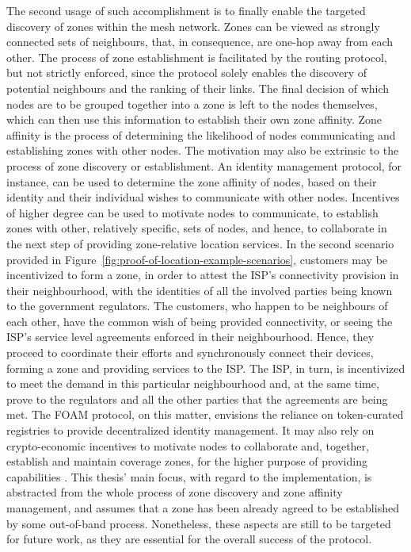 The second usage of such accomplishment is to finally enable the targeted discovery of zones within the mesh network. Zones can be viewed as strongly connected sets of neighbours, that, in consequence, are one-hop away from each other. The process of zone establishment is facilitated by the routing protocol, but not strictly enforced, since the protocol solely enables the discovery of potential neighbours and the ranking of their links. The final decision of which nodes are to be grouped together into a zone is left to the nodes themselves, which can then use this information to establish their own zone affinity. Zone affinity is the process of determining the likelihood of nodes communicating and establishing zones with other nodes. The motivation may also be extrinsic to the process of zone discovery or establishment. An identity management protocol, for instance, can be used to determine the zone affinity of nodes, based on their identity and their individual wishes to communicate with other nodes. Incentives of higher degree can be used to motivate nodes to communicate, to establish zones with other, relatively specific, sets of nodes, and hence, to collaborate in the next step of providing zone-relative location services. In the second scenario provided in Figure~\ref{fig:proof-of-location-example-scenarios}, customers may be incentivized to form a zone, in order to attest the ISP's connectivity provision in their neighbourhood, with the identities of all the involved parties being known to the government regulators. The customers, who happen to be neighbours of each other, have the common wish of being provided connectivity, or seeing the ISP's service level agreements enforced in their neighbourhood. Hence, they proceed to coordinate their efforts and synchronously connect their devices, forming a zone and providing \pol{} services to the ISP. The ISP, in turn, is incentivized to meet the demand in this particular neighbourhood and, at the same time, prove to the regulators and all the other parties that the agreements are being met. The FOAM protocol, on this matter, envisions the reliance on token-curated registries to provide decentralized identity management. It may also rely on crypto-economic incentives to motivate nodes to collaborate and, together, establish and maintain coverage zones, for the higher purpose of providing \pol{} capabilities \cite{foam-white-paper}. This thesis' main focus, with regard to the \poc{} implementation, is abstracted from the whole process of zone discovery and zone affinity management, and assumes that a zone has been already agreed to be established by some out-of-band process. Nonetheless, these aspects are still to be targeted for future work, as they are essential for the overall success of the protocol.

